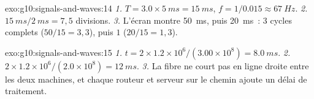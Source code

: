 \begin{solution}{exo:g10:signals-and-waves:14}
\emph{1.} $T = 3.0 \times \qty{5}{ms} = \qty{15}{ms}$,
$f = 1/0.015 \approx \qty{67}{Hz}$.
\emph{2.} $\qty{15}{ms}/\qty{2}{ms} = 7{,}5$ divisions.
\emph{3.} L'écran montre \qty{50}{ms}, puis \qty{20}{ms}~: $3$ cycles
complets ($50/15 = 3{,}3$), puis $1$ ($20/15 = 1{,}3$).
\end{solution}

\begin{solution}{exo:g10:signals-and-waves:15}
\emph{1.} $t = 2 \times 1.2\times10^{6}/(3.00\times10^{8}) =
\qty{8.0}{ms}$.
\emph{2.} $2 \times 1.2\times10^{6}/(2.0\times10^{8}) = \qty{12}{ms}$.
\emph{3.} La fibre ne court pas en ligne droite entre les deux
machines, et chaque routeur et serveur sur le chemin ajoute un délai
de traitement.
\end{solution}


